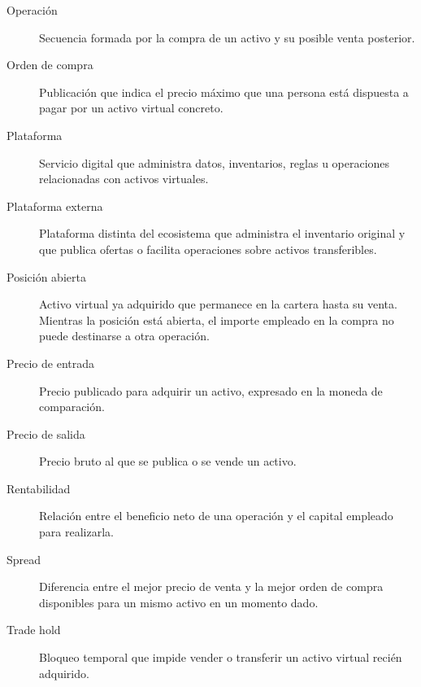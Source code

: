 \begin{description}
  \item[Operación] Secuencia formada por la compra de un activo y su posible venta posterior.
  \item[Orden de compra] Publicación que indica el precio máximo que una persona está dispuesta a pagar por un activo virtual concreto.
  \item[Plataforma] Servicio digital que administra datos, inventarios, reglas u operaciones relacionadas con activos virtuales.
  \item[Plataforma externa] Plataforma distinta del ecosistema que administra el inventario original y que publica ofertas o facilita operaciones sobre activos transferibles.
  \item[Posición abierta] Activo virtual ya adquirido que permanece en la cartera hasta su venta. Mientras la posición está abierta, el importe empleado en la compra no puede destinarse a otra operación.
  \item[Precio de entrada] Precio publicado para adquirir un activo, expresado en la moneda de comparación.
  \item[Precio de salida] Precio bruto al que se publica o se vende un activo.
  \item[Rentabilidad] Relación entre el beneficio neto de una operación y el capital empleado para realizarla.
  \item[Spread] Diferencia entre el mejor precio de venta y la mejor orden de compra disponibles para un mismo activo en un momento dado.
  \item[Trade hold] Bloqueo temporal que impide vender o transferir un activo virtual recién adquirido.
\end{description}
\indicebottomrule
